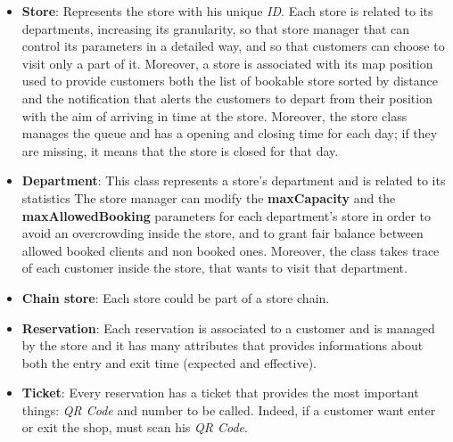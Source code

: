 \documentclass{article}
\begin{document}
\begin{itemize}
\begin{itemize}
				\end{itemize}
			
				\item {\bfseries Store}: Represents the store with his unique \emph{ID}. Each store is related to its departments, increasing its granularity, so that store manager that can control its parameters in a detailed way, and so that customers can choose to visit only a part of it. Moreover, a store is associated with its map position used to provide customers both the list of bookable store sorted by distance and the notification that alerts the customers to depart from their position with the aim of arriving in time at the store. Moreover, the store class manages the queue and has a opening and closing time for each day; if they are missing, it means that the store is closed for that day.
				
				\item {\bfseries Department}: This class represents a store's department and is related to its statistics The store manager can modify the {\bfseries maxCapacity} and the {\bfseries maxAllowedBooking} parameters for each department's store in order to avoid an overcrowding inside the store, and to grant fair balance between allowed booked clients and non booked ones. Moreover, the class takes trace of each customer inside the store, that wants to visit that department.
				
				\item {\bfseries Chain store}: Each store could be part of a store chain.
				
				\item {\bfseries Reservation}: Each reservation is associated to a customer and is managed by the store and it has many attributes that provides informations about both the entry and exit time (expected and effective).
				
				\item {\bfseries Ticket}: Every reservation has a ticket that provides the most important things: \emph{QR Code} and number to be called. Indeed, if a customer want enter or exit the shop, must scan his \emph{QR Code}.
			\end{itemize}
		
\end{document}
